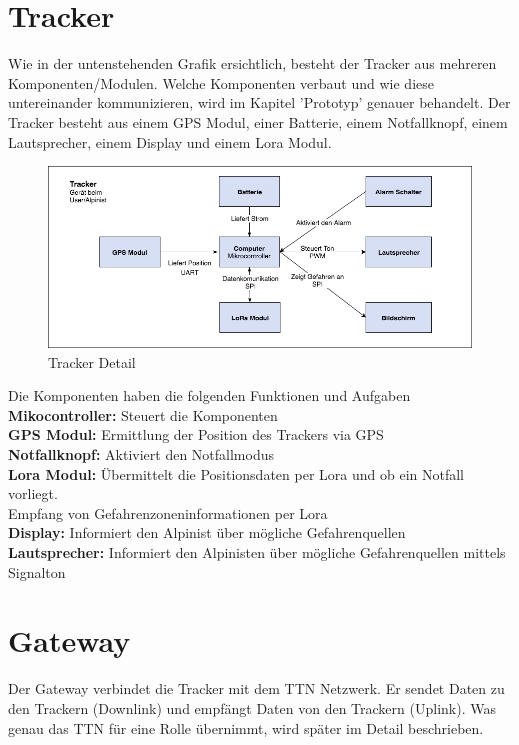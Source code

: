 \documentclass[11pt,english,german]{report}
\theoremstyle{definition}
\begin{document}
\section{Tracker}
Wie in der untenstehenden Grafik ersichtlich, besteht der Tracker aus mehreren Komponenten/Modulen. Welche Komponenten verbaut und wie diese untereinander kommunizieren, wird im Kapitel 'Prototyp' genauer behandelt. Der Tracker besteht aus einem GPS Modul, einer Batterie, einem Notfallknopf, einem Lautsprecher, einem Display und einem Lora Modul.
\begin{figure}[H]
	\centering
	\includegraphics[width=\textwidth]{img/system/ATAS_SystemOverview_Tracker_BA.png}
	\caption[Tracker Detail]
	{Tracker Detail}
\end{figure}
\noindent
Die Komponenten haben die folgenden Funktionen und Aufgaben\\[0.3cm]
\textbf{Mikocontroller:} Steuert die Komponenten\\[0.3cm] 
\textbf{GPS Modul:} Ermittlung der Position des Trackers via GPS\\[0.3cm]
\textbf{Notfallknopf:} Aktiviert den Notfallmodus\\[0.3cm]
\textbf{Lora Modul:} Übermittelt die Positionsdaten per Lora und ob ein Notfall vorliegt. \\Empfang von Gefahrenzoneninformationen per Lora\\[0.3cm]
\textbf{Display:} Informiert den Alpinist über mögliche Gefahrenquellen\\[0.3cm]
\textbf{Lautsprecher: }Informiert den Alpinisten über mögliche Gefahrenquellen mittels Signalton

\newpage
\section{Gateway}
Der Gateway verbindet die Tracker mit dem TTN Netzwerk. Er sendet Daten zu den Trackern (Downlink) und empfängt Daten von den Trackern (Uplink). Was genau das TTN für eine Rolle übernimmt, wird später im Detail beschrieben.
\end{document}
